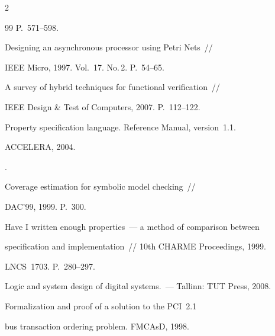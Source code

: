 \begin{multicols}{2}
{{\begin{thebibliography}{99}
P.~571--598.









Designing an asynchronous processor using Petri Nets~//


IEEE Micro, 1997. Vol.~17. No.\,2. P.~54--65.









A survey of hybrid techniques for functional verification~//


IEEE Design \& Test of Computers, 2007. P.~112--122.







Property specification language. Reference Manual,  version~1.1.


ACCELERA, 2004.







.


Coverage estimation for symbolic model checking~//


DAC'99,  1999. P.~300.












Have I written enough properties~--- a method of comparison between


specification and implementation~// 10th CHARME Proceedings, 1999.


LNCS~1703. P.~280--297.









Logic and system design of digital systems.~--- Tallinn: TUT Press, 2008.









Formalization and proof of a solution to the PCI~2.1


bus transaction ordering problem. FMCAsD, 1998.





\end{thebibliography}


}


}


\end{multicols}
